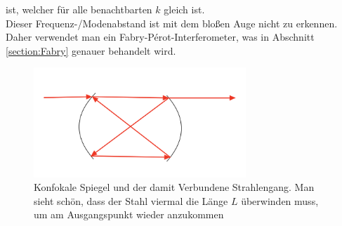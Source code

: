 ist, welcher für alle benachtbarten $k$ gleich ist.\\
Dieser Frequenz-/Modenabstand ist mit dem bloßen Auge nicht zu erkennen. Daher verwendet man ein Fabry-Pérot-Interferometer, was in Abschnitt \ref{section:Fabry} genauer behandelt wird.

\begin{figure}[ht]
    \centering
    \includegraphics[width = 8cm]{Bilder/Auswertung/KonfokalSpiegel.png}
    \caption{Konfokale Spiegel und der damit Verbundene Strahlengang. Man sieht schön, dass der Stahl viermal die Länge $L$ überwinden muss, um am Ausgangspunkt wieder anzukommen}
    \label{bild:Konfokal}
\end{figure}